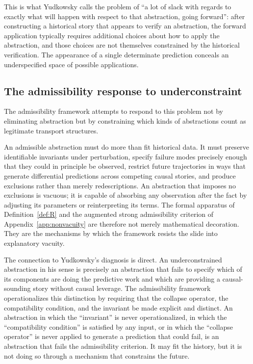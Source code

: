 \documentclass[12pt, a4paper]{article}
\theoremstyle{plain}
\theoremstyle{definition}
\theoremstyle{remark}
\begin{document}
This is what Yudkowsky calls the problem of ``a lot of slack with regards to exactly
what will happen with respect to that abstraction, going forward'': after constructing
a historical story that appears to verify an abstraction, the forward application
typically requires additional choices about how to apply the abstraction, and those
choices are not themselves constrained by the historical verification.
The appearance of a single determinate prediction conceals an underspecified space of
possible applications.

\subsection{The admissibility response to underconstraint}

The admissibility framework attempts to respond to this problem not by eliminating
abstraction but by constraining which kinds of abstractions count as legitimate
transport structures.

An admissible abstraction must do more than fit historical data.
It must preserve identifiable invariants under perturbation, specify failure modes
precisely enough that they could in principle be observed, restrict future trajectories
in ways that generate differential predictions across competing causal stories, and
produce exclusions rather than merely redescriptions.
An abstraction that imposes no exclusions is vacuous; it is capable of absorbing any
observation after the fact by adjusting its parameters or reinterpreting its terms.
The formal apparatus of Definition~\ref{def:R} and the augmented strong admissibility
criterion of Appendix~\ref{app:nonvacuity} are therefore not merely mathematical
decoration.
They are the mechanisms by which the framework resists the slide into explanatory
vacuity.

The connection to Yudkowsky's diagnosis is direct.
An underconstrained abstraction in his sense is precisely an abstraction that fails to
specify which of its components are doing the predictive work and which are providing
a causal-sounding story without causal leverage.
The admissibility framework operationalizes this distinction by requiring that the
collapse operator, the compatibility condition, and the invariant be made explicit
and distinct.
An abstraction in which the ``invariant'' is never operationalized, in which the
``compatibility condition'' is satisfied by any input, or in which the ``collapse
operator'' is never applied to generate a prediction that could fail, is an abstraction
that fails the admissibility criterion.
It may fit the history, but it is not doing so through a mechanism that constrains the
future.
\end{document}
